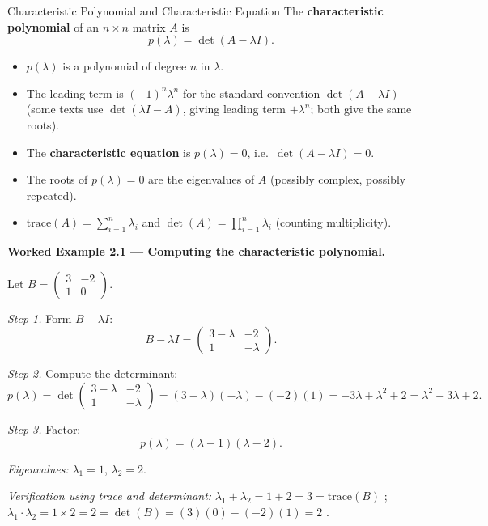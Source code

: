 \documentclass[12pt,a4paper]{article}
\begin{document}
\begin{infobox}{Characteristic Polynomial and Characteristic Equation}
The \textbf{characteristic polynomial} of an $n \times n$ matrix $A$ is
\[
  p(\lambda) = \det(A - \lambda I).
\]
\begin{itemize}
  \item $p(\lambda)$ is a polynomial of degree $n$ in $\lambda$.
  \item The leading term is $(-1)^n \lambda^n$ for the standard convention $\det(A - \lambda I)$
        (some texts use $\det(\lambda I - A)$, giving leading term $+\lambda^n$; both give the same roots).
  \item The \textbf{characteristic equation} is $p(\lambda) = 0$, i.e.\ $\det(A - \lambda I) = 0$.
  \item The roots of $p(\lambda) = 0$ are the eigenvalues of $A$ (possibly complex, possibly repeated).
  \item $\text{trace}(A) = \sum_{i=1}^n \lambda_i$ and $\det(A) = \prod_{i=1}^n \lambda_i$
        (counting multiplicity).
\end{itemize}
\end{infobox}

\textbf{Worked Example 2.1 --- Computing the characteristic polynomial.}

Let $B = \begin{pmatrix} 3 & -2 \\ 1 & 0 \end{pmatrix}$.

\textit{Step 1.} Form $B - \lambda I$:
\[
  B - \lambda I = \begin{pmatrix} 3-\lambda & -2 \\ 1 & -\lambda \end{pmatrix}.
\]

\textit{Step 2.} Compute the determinant:
\[
  p(\lambda) = \det\begin{pmatrix} 3-\lambda & -2 \\ 1 & -\lambda \end{pmatrix}
  = (3-\lambda)(-\lambda) - (-2)(1)
  = -3\lambda + \lambda^2 + 2
  = \lambda^2 - 3\lambda + 2.
\]

\textit{Step 3.} Factor:
\[
  p(\lambda) = (\lambda - 1)(\lambda - 2).
\]

\textit{Eigenvalues:} $\lambda_1 = 1$, $\lambda_2 = 2$.

\textit{Verification using trace and determinant:}
$\lambda_1 + \lambda_2 = 1 + 2 = 3 = \text{trace}(B)$ \checkmark; \quad
$\lambda_1 \cdot \lambda_2 = 1 \times 2 = 2 = \det(B) = (3)(0) - (-2)(1) = 2$ \checkmark.
\end{document}
